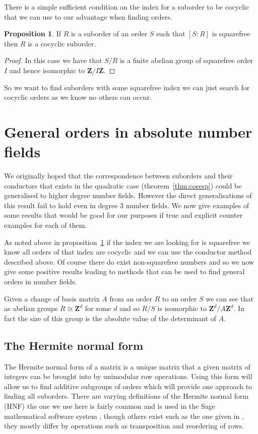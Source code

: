 \documentclass[12pt,a4paper,abstracton,bibtotoc]{scrreprt}
\theoremstyle{definition}
\newtheorem{prop}{Proposition}
\newcommand{\ZZ}{\mathbf{Z}}
\begin{document}
There is a simple sufficient condition on the index for a suborder to be cocyclic that we can use to our advantage when finding orders.

\begin{prop}
\label{prop:sqfree}
If $R$ is a suborder of an order $S$ such that $[S:R]$ is squarefree then $R$ is a cocyclic suborder.
\end{prop}

\begin{proof}
In this case we have that $S/R$ is a finite abelian group of squarefree order $I$ and hence isomorphic to $\ZZ/I\ZZ$.
\end{proof}

So we want to find suborders with some squarefree index we can just search for cocyclic orders as we know no others can occur.

\section{General orders in absolute number fields}

We originally hoped that the correspondence between suborders and their conductors that exists in the quadratic case (theorem~\ref{thm:coresp}) could be generalised to higher degree number fields.
However the direct generalisations of this result fail to hold even in degree 3 number fields.
We now give examples of some results that would be good for our purposes if true and explicit counter examples for each of them.

As noted above in proposition~\ref{prop:sqfree} if the index we are looking for is squarefree we know all orders of that index are cocyclic and we can use the conductor method described above.
Of course there do exist non-squarefree numbers and so we now give some positive results leading to methods that can be used to find general orders in number fields.

Given a change of basis matrix $A$ from an order $R$ to an order $S$ we can see that as abelian groups $R \cong \ZZ^d$ for some $d$ and so $R/S$ is isomorphic to $\ZZ^d/A\ZZ^d$.
In fact the size of this group is the absolute value of the determinant of $A$.

\subsection{The Hermite normal form}
The Hermite normal form of a matrix is a unique matrix that a given matrix of integers can be brought into by unimodular row operations.
Using this form will allow us to find additive subgroups of orders which will provide one approach to finding all suborders.
There are varying definitions of the Hermite normal form (HNF) the one we use here is fairly common and is used in the Sage mathematical software system \cite{sage}, though others exist such as the one given in \cite{cohen93}, they mostly differ by operations such as transposition and reordering of rows.
\end{document}
